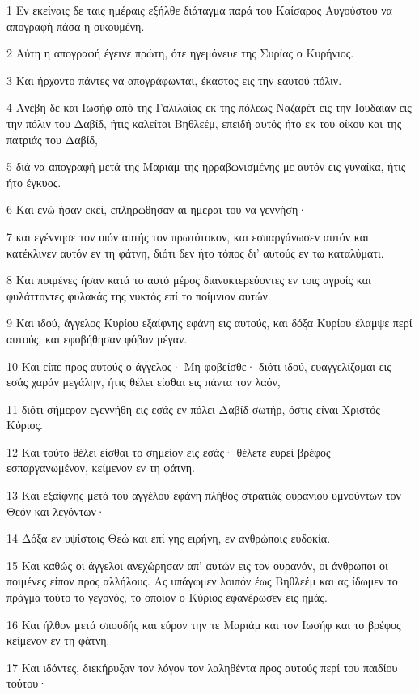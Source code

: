 \par 1 Εν εκείναις δε ταις ημέραις εξήλθε διάταγμα παρά του Καίσαρος Αυγούστου να απογραφή πάσα η οικουμένη.
\par 2 Αύτη η απογραφή έγεινε πρώτη, ότε ηγεμόνευε της Συρίας ο Κυρήνιος.
\par 3 Και ήρχοντο πάντες να απογράφωνται, έκαστος εις την εαυτού πόλιν.
\par 4 Ανέβη δε και Ιωσήφ από της Γαλιλαίας εκ της πόλεως Ναζαρέτ εις την Ιουδαίαν εις την πόλιν του Δαβίδ, ήτις καλείται Βηθλεέμ, επειδή αυτός ήτο εκ του οίκου και της πατριάς του Δαβίδ,
\par 5 διά να απογραφή μετά της Μαριάμ της ηρραβωνισμένης με αυτόν εις γυναίκα, ήτις ήτο έγκυος.
\par 6 Και ενώ ήσαν εκεί, επληρώθησαν αι ημέραι του να γεννήση·
\par 7 και εγέννησε τον υιόν αυτής τον πρωτότοκον, και εσπαργάνωσεν αυτόν και κατέκλινεν αυτόν εν τη φάτνη, διότι δεν ήτο τόπος δι' αυτούς εν τω καταλύματι.
\par 8 Και ποιμένες ήσαν κατά το αυτό μέρος διανυκτερεύοντες εν τοις αγροίς και φυλάττοντες φυλακάς της νυκτός επί το ποίμνιον αυτών.
\par 9 Και ιδού, άγγελος Κυρίου εξαίφνης εφάνη εις αυτούς, και δόξα Κυρίου έλαμψε περί αυτούς, και εφοβήθησαν φόβον μέγαν.
\par 10 Και είπε προς αυτούς ο άγγελος· Μη φοβείσθε· διότι ιδού, ευαγγελίζομαι εις εσάς χαράν μεγάλην, ήτις θέλει είσθαι εις πάντα τον λαόν,
\par 11 διότι σήμερον εγεννήθη εις εσάς εν πόλει Δαβίδ σωτήρ, όστις είναι Χριστός Κύριος.
\par 12 Και τούτο θέλει είσθαι το σημείον εις εσάς· θέλετε ευρεί βρέφος εσπαργανωμένον, κείμενον εν τη φάτνη.
\par 13 Και εξαίφνης μετά του αγγέλου εφάνη πλήθος στρατιάς ουρανίου υμνούντων τον Θεόν και λεγόντων·
\par 14 Δόξα εν υψίστοις Θεώ και επί γης ειρήνη, εν ανθρώποις ευδοκία.
\par 15 Και καθώς οι άγγελοι ανεχώρησαν απ' αυτών εις τον ουρανόν, οι άνθρωποι οι ποιμένες είπον προς αλλήλους. Ας υπάγωμεν λοιπόν έως Βηθλεέμ και ας ίδωμεν το πράγμα τούτο το γεγονός, το οποίον ο Κύριος εφανέρωσεν εις ημάς.
\par 16 Και ήλθον μετά σπουδής και εύρον την τε Μαριάμ και τον Ιωσήφ και το βρέφος κείμενον εν τη φάτνη.
\par 17 Και ιδόντες, διεκήρυξαν τον λόγον τον λαληθέντα προς αυτούς περί του παιδίου τούτου·
